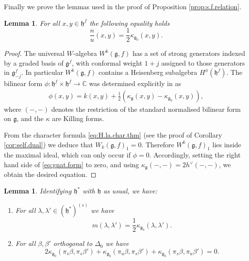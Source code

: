 \documentclass[12pt]{amsart}
\theoremstyle{plain}
\newtheorem{lemma}[thm]{Lemma}
\theoremstyle{definition}
\numberwithin{equation}{section}
\newcommand{\la}{\lambda}
\newcommand{\D}{\Delta}
\newcommand{\C}{\mathbb{C}}
\newcommand{\g}{\mathfrak{g}}
\newcommand{\h}{\mathfrak{h}}
\begin{document}


Finally we prove the lemmas used in the proof of Proposition \ref{prop:s.f.relation}.
\begin{lemma}\label{lem:killing.relation}
For all $x, y \in \h^f$ the following equality holds
\[
\frac{n}{u} (x, y) = \frac{1}{2} \kappa_{\g_0}(x, y).
\]
\end{lemma}

\begin{proof}
The universal $W$-algebra $W^k(\g, f)$ has a set of strong generators indexed by a graded basis of $\g^f$, with conformal weight $1+j$ assigned to those generators in $\g_{-j}^f$. In particular $W^k(\g, f)$ contains a Heisenberg subalgebra $H^\phi(\h^f)$. The bilinear form $\phi : \h^f \times \h^f \rightarrow \C$ was determined explicitly in \cite[Theorem 2.4(c)]{KRW03} as
\begin{align}\label{eq:gnat.form}
\phi(x, y) = k (x, y) + \frac{1}{2} \left( \kappa_{\g}(x, y) - \kappa_{\g_0}(x, y) \right),
\end{align}
where $(-, -)$ denotes the restriction of the standard normalised bilinear form on $\g$, and the $\kappa$ are Killing forms.

From the character formula \eqref{eq:H.la.char.thm} (see the proof of Corollary \ref{cor:self.dual}) we deduce that $W_k(\g, f)_1 = 0$. Therefore $W^k(\g, f)_1$ lies inside the maximal ideal, which can only occur if $\phi = 0$. Accordingly, setting the right hand side of \eqref{eq:gnat.form} to zero, and using $\kappa_\g(-,-) = 2h^\vee (-,-)$, we obtain the desired equation.
\end{proof}

\begin{lemma}\label{lem:swapper}
Identifying $\h^*$ with $\h$ as usual, we have:
\begin{enumerate}
\item For all $\la, \la' \in (\h^*)^{(s)}$ we have
\[
m (\la, \la') = \frac{1}{2}\kappa_{\g_0}(\la, \la').
\]

\item For all $\beta, \beta'$ orthogonal to $\D_0$ we have
\[
2\kappa_{\g_0}(\pi_s\beta, \pi_s\beta') + \kappa_{\g_0}(\pi_u\beta, \pi_s\beta') + \kappa_{\g_0}(\pi_s\beta, \pi_u\beta') = 0.
\]
\end{enumerate}
\end{lemma}
\end{document}
